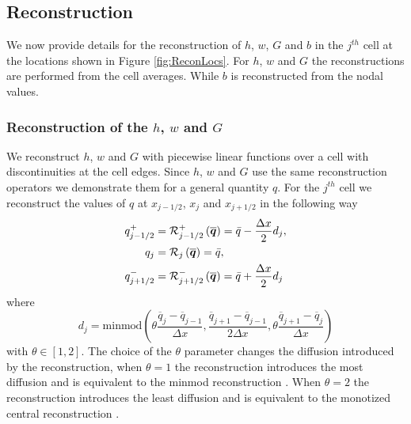 \setcounter{subsection}{0}
\renewcommand{\thesubsection}{(\roman{subsection})} 
\subsection{Reconstruction}
\label{subsec:Reconstruction}
We now provide details for the reconstruction of $h$, $w$, $G$ and $b$ in the $j^{th}$ cell at the locations shown in Figure \ref{fig:ReconLocs}. For $h$, $w$ and $G$ the reconstructions are performed from the cell averages. While $b$ is reconstructed from the nodal values.


\subsubsection{Reconstruction of the $h$, $w$ and $G$}
We reconstruct $h$, $w$ and $G$ with piecewise linear functions over a cell with discontinuities at the cell edges. Since $h$, $w$ and $G$ use the same reconstruction operators we demonstrate them for a general quantity $q$. For the $j^{th}$ cell we reconstruct the values of $q$ at $x_{j-1/2} $, $x_{j} $ and $x_{j+1/2}$ in the following way
\begin{subequations}
	\begin{align}
	q^+_{j-1/2} & = \mathcal{R}^+_{j-1/2} \left(\overline{\boldsymbol{q}}\right) = \bar{q} - \dfrac{\Delta x}{2} d_j, \\
	q_{j} &= \mathcal{R}_{j} \left(\overline{\boldsymbol{q}}\right) =\bar{q} ,\\
	q^-_{j+1/2} &= \mathcal{R}^-_{j+1/2} \left(\overline{\boldsymbol{q}}\right) = \bar{q} + \dfrac{\Delta x}{2} d_j
	\end{align}
	\label{eqn:ReconforhwG}
\end{subequations}
where 
\begin{equation}
d_j = \text{minmod}\left(\theta \dfrac{\overline{q}_j -\overline{q}_{j-1} }{\Delta x}, \dfrac{\overline{q}_{j+1} -\overline{q}_{j-1} }{2\Delta x}, \theta\dfrac{\overline{q}_{j+1} -\overline{q}_{j} }{\Delta x}\right)
\label{eqn:slopehGrecon}
\end{equation}
with $\theta \in \left[1,2\right]$. The choice of the $\theta$ parameter changes the diffusion introduced by the reconstruction, when $\theta =1$ the reconstruction introduces the most diffusion and is equivalent to the minmod reconstruction \cite{Roe-1986-337}. When $\theta = 2$ the reconstruction introduces the least diffusion and is equivalent to the monotized central reconstruction \cite{VanLeer-1977-276}.

